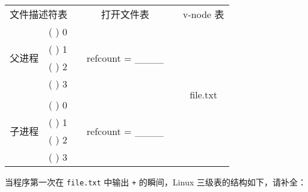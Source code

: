 \begin{problems}
\begin{table}[H]
\begin{tabular}{cccccc}
                \multicolumn{2}{c}{文件描述符表} & {\qquad} & 打开文件表 & {\qquad} & v-node 表 \\ \cline{1-2} \cline{4-4} \cline{6-6} 
                \multicolumn{1}{|c|}{\multirow{4}{*}{父进程}} & \multicolumn{1}{c|}{(     ) 0} & \multicolumn{1}{c|}{} & \multicolumn{1}{c|}{\multirow{4}{*}{refcount = \_\_\_\_}} & \multicolumn{1}{c|}{} & \multicolumn{1}{c|}{\multirow{9}{*}{file.txt}} \\ \cline{2-2}
                \multicolumn{1}{|c|}{} & \multicolumn{1}{c|}{(     ) 1} & \multicolumn{1}{c|}{} & \multicolumn{1}{c|}{} & \multicolumn{1}{c|}{} & \multicolumn{1}{c|}{} \\ \cline{2-2}
                \multicolumn{1}{|c|}{} & \multicolumn{1}{c|}{(     ) 2} & \multicolumn{1}{c|}{} & \multicolumn{1}{c|}{} & \multicolumn{1}{c|}{} & \multicolumn{1}{c|}{} \\ \cline{2-2}
                \multicolumn{1}{|c|}{} & \multicolumn{1}{c|}{(     ) 3} & \multicolumn{1}{c|}{} & \multicolumn{1}{c|}{} & \multicolumn{1}{c|}{} & \multicolumn{1}{c|}{} \\ \cline{1-2} \cline{4-4}
                &  &  &  & \multicolumn{1}{c|}{} & \multicolumn{1}{c|}{} \\ \cline{1-2} \cline{4-4}
                \multicolumn{1}{|c|}{\multirow{4}{*}{子进程}} & \multicolumn{1}{c|}{(     ) 0} & \multicolumn{1}{c|}{} & \multicolumn{1}{c|}{\multirow{4}{*}{refcount = \_\_\_\_}} & \multicolumn{1}{c|}{} & \multicolumn{1}{c|}{} \\ \cline{2-2}
                \multicolumn{1}{|c|}{} & \multicolumn{1}{c|}{(     ) 1} & \multicolumn{1}{c|}{} & \multicolumn{1}{c|}{} & \multicolumn{1}{c|}{} & \multicolumn{1}{c|}{} \\ \cline{2-2}
                \multicolumn{1}{|c|}{} & \multicolumn{1}{c|}{(     ) 2} & \multicolumn{1}{c|}{} & \multicolumn{1}{c|}{} & \multicolumn{1}{c|}{} & \multicolumn{1}{c|}{} \\ \cline{2-2}
                \multicolumn{1}{|c|}{} & \multicolumn{1}{c|}{(     ) 3} & \multicolumn{1}{c|}{} & \multicolumn{1}{c|}{} & \multicolumn{1}{c|}{} & \multicolumn{1}{c|}{} \\ \cline{1-2} \cline{4-4} \cline{6-6} 
            \end{tabular}
        \end{table}
        \subqn 当程序第一次在 \verb|file.txt| 中输出 \verb|+| 的瞬间，Linux 三级表的结构如下，请补全：
        \begin{table}[H]
            \tt
            \centering

\end{table}
\end{problems}
